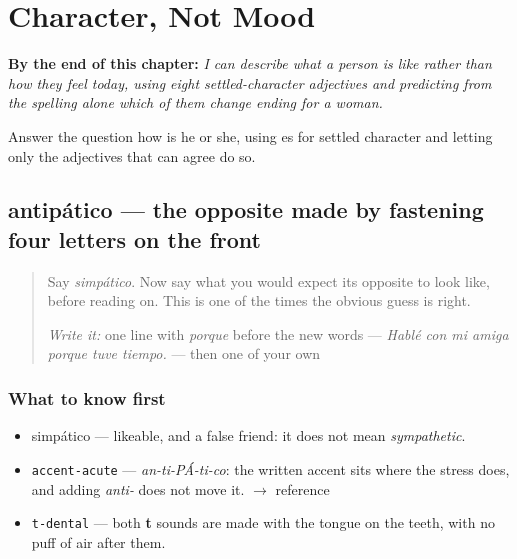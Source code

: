 
\chapter{Character, Not Mood}
\label{ch:caracter}

\begin{chapteropening}
\textbf{By the end of this chapter:} \emph{I can describe what a person is like rather than how they feel today, using eight settled-character adjectives and predicting from the spelling alone which of them change ending for a woman.}

Answer the question how is he or she, using es for settled character and letting only the adjectives that can agree do so.
\end{chapteropening}

\section[antipático]{antipático — the opposite made by fastening four letters on the front}

\label{lesson:ES-C423-antipatico}



\begin{quote}
Say \emph{simpático}. Now say what you would expect its opposite to look like, before reading on. This is one of the times the obvious guess is right.

\emph{Write it:} one line with \emph{porque} before the new words — \emph{Hablé con mi amiga porque tuve tiempo.} — then one of your own
\end{quote}

\subsection*{What to know first}
\begin{itemize}
\raggedright
  \item simpático — likeable, and a false friend: it does not mean \emph{sympathetic}.
\end{itemize}

\begin{sounds}
\begin{itemize}
\raggedright
  \item \texttt{accent-acute} — \emph{an-ti-PÁ-ti-co}: the written accent sits where the stress does, and adding \emph{anti-} does not move it. $\to$ reference
  \item \texttt{t-dental} — both \textbf{t} sounds are made with the tongue on the teeth, with no puff of air after them.
\end{itemize}
\end{sounds}

